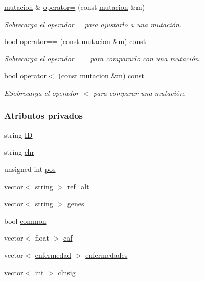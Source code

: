\begin{DoxyCompactItemize}
\hyperlink{classmutacion}{mutacion} \& \hyperlink{classmutacion_aa38c36e397000cbef22a5933f56d59ed}{operator=} (const \hyperlink{classmutacion}{mutacion} \&m)
\begin{DoxyCompactList}\small\item\em Sobrecarga el operador = para ajustarlo a una mutación. \end{DoxyCompactList}\item 
bool \hyperlink{classmutacion_a0c67e3d41ce47338856954f60815bacd}{operator==} (const \hyperlink{classmutacion}{mutacion} \&m) const
\begin{DoxyCompactList}\small\item\em Sobrecarga el operador == para compararlo con una mutación. \end{DoxyCompactList}\item 
bool \hyperlink{classmutacion_a5619b00cf3de4fc510c081d2d1841cd2}{operator$<$} (const \hyperlink{classmutacion}{mutacion} \&m) const
\begin{DoxyCompactList}\small\item\em E\+Sobrecarga el operador $<$ para comparar una mutación. \end{DoxyCompactList}\end{DoxyCompactItemize}
\subsubsection*{Atributos privados}
\begin{DoxyCompactItemize}
\item 
string \hyperlink{classmutacion_aafc39218473e0f21eb0c3dc05dd4f35e}{ID}
\item 
string \hyperlink{classmutacion_a57651966b952f782240ff9cff72c5d2f}{chr}
\item 
unsigned int \hyperlink{classmutacion_ae1487b8648d0eaad68de5e4e5a87f3ff}{pos}
\item 
vector$<$ string $>$ \hyperlink{classmutacion_abeb13e023fc9a34120106bccf58d5086}{ref\+\_\+alt}
\item 
vector$<$ string $>$ \hyperlink{classmutacion_a65fb9e2186d1c54d490289661b141aa1}{genes}
\item 
bool \hyperlink{classmutacion_a6dabfef6167d64030f095887b15f65dd}{common}
\item 
vector$<$ float $>$ \hyperlink{classmutacion_aeb2ac56009900d9319873d00ee80e090}{caf}
\item 
vector$<$ \hyperlink{classenfermedad}{enfermedad} $>$ \hyperlink{classmutacion_a0decaa0406675999e766f913e6347d79}{enfermedades}
\item 
vector$<$ int $>$ \hyperlink{classmutacion_adc0290c4a6db7f4c7341b0183c7ef534}{clnsig}
\end{DoxyCompactItemize}


